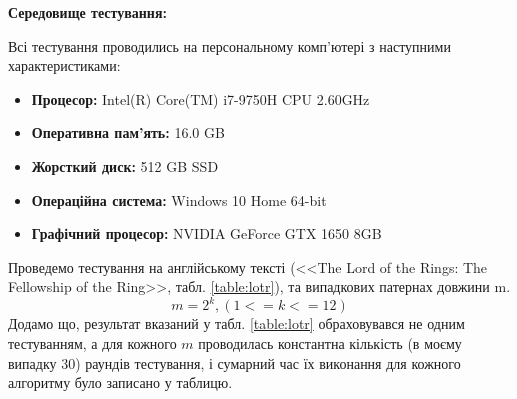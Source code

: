 \documentclass[a4paper,14pt]{extarticle} %
\begin{document}
	\textbf{Середовище тестування:}

	Всі тестування проводились на персональному комп'ютері з наступними характеристиками:
	\begin{itemize}
		\item \textbf{Процесор:} Intel(R) Core(TM) i7-9750H CPU 2.60GHz
		\item \textbf{Оперативна пам'ять:} 16.0 GB
		\item \textbf{Жорсткий диск:} 512 GB SSD
		\item \textbf{Операційна система:} Windows 10 Home 64-bit
		\item \textbf{Графічний процесор:} NVIDIA GeForce GTX 1650 8GB
	\end{itemize}

	Проведемо тестування на англійському тексті (<<The Lord of the Rings: The Fellowship of the Ring>>, табл. \ref{table:lotr}), та випадкових патернах довжини m. $$m=2^k, (1<=k<=12)$$
	Додамо що, результат вказаний у табл. \ref{table:lotr} обраховувався не одним тестуванням, а для кожного $m$ проводилась константна кількість (в моєму випадку 30) раундів тестування, і сумарний час їх виконання для кожного алгоритму було записано у таблицю.
\end{document}
